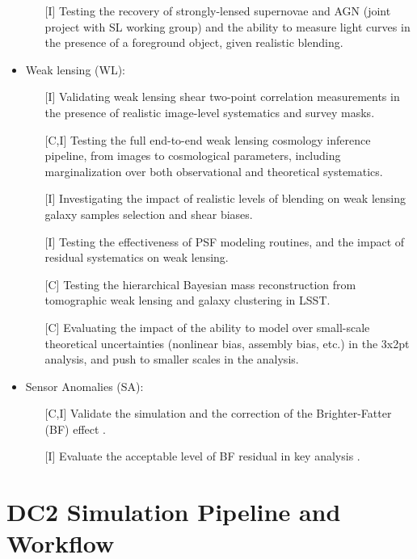 \documentclass[preprint,times]{aastex61}
\begin{document}
\begin{itemize}
\begin{enumerate}
\item[{[I]}] Testing the recovery of strongly-lensed supernovae and AGN (joint project with SL working group) and the ability to measure light curves in the presence of a foreground object, given realistic blending.
\end{enumerate}
\item Weak lensing (WL):
\begin{enumerate}
\item[{[I]}] Validating weak lensing shear two-point correlation measurements in the presence of realistic image-level systematics and survey masks.
\item[{[C,I]}] Testing the full end-to-end weak lensing cosmology inference pipeline, from images to cosmological parameters, including marginalization over both observational and theoretical systematics.
\item[{[I]}] Investigating the impact of realistic levels of blending on weak lensing galaxy samples selection and shear biases.
\item[{[I]}] Testing the effectiveness of PSF modeling routines, and the impact of residual systematics on weak lensing.
\item[{[C]}] Testing the hierarchical Bayesian mass reconstruction from tomographic weak lensing and galaxy clustering in LSST.
\item[{[C]}] Evaluating the impact of the ability to model over small-scale theoretical uncertainties (nonlinear bias, assembly bias, etc.) in the 3x2pt analysis, and push to smaller scales in the analysis.
\end{enumerate}
\item Sensor Anomalies (SA):
\begin{enumerate}
\item[{[C,I]}] Validate the simulation and the  correction of the Brighter-Fatter (BF)  effect .
\item[{[I]}]  Evaluate the acceptable level of  BF residual in key analysis . 
\end{enumerate}
\end{itemize}

\section{DC2 Simulation Pipeline and Workflow}
\end{document}
